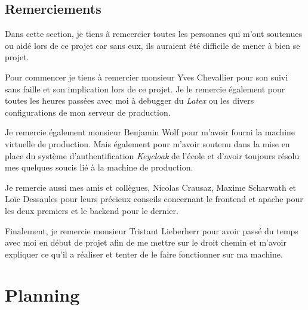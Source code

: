 \documentclass[
    iai, %
    il, %
]{heig-tb}
\begin{document}
\begin{enumerate}
\section{Remerciements}
Dans cette section, je tiens à remcercier toutes les personnes qui m'ont soutenues ou aidé lors de ce projet car sans eux, ils auraient été difficile de mener à bien se projet.

Pour commencer je tiens à remercier monsieur Yves Chevallier pour son suivi sans faille et son implication lors de ce projet. Je le remercie également pour toutes les heures passées avec moi à debugger du \emph{Latex} ou les divers configurations de mon serveur de production.

Je remercie également monsieur Benjamin Wolf pour m'avoir fourni la machine virtuelle de production. Mais également pour m'avoir soutenu dans la mise en place du système d'authentification \emph{Keycloak} de l'école et d'avoir toujours résolu mes quelques soucis lié à la machine de production.

Je remercie aussi mes amis et collègues, Nicolas Crausaz, Maxime Scharwath et Loïc Dessaules pour leurs précieux conseils concernant le \Gls{frontend} et \Gls{apache} pour les deux premiers et le \Gls{backend} pour le dernier.

Finalement, je remercie monsieur Tristant Lieberherr pour avoir passé du temps avec moi en début de projet afin de me mettre sur le droit chemin et m'avoir expliquer ce qu'il a réaliser et tenter de le faire fonctionner sur ma machine.

\vfil
\hspace{8cm}\makeatletter\@author\makeatother\par
\hspace{8cm}\begin{minipage}{5cm}
    \printsignature
\end{minipage}
\clearpage

\appendix
\appendixpage
\addappheadtotoc

\chapter{Planning}

\begin{landscape}
    
\end{landscape}

\begin{landscape}
    
\end{landscape}


\end{enumerate}
\end{document}
